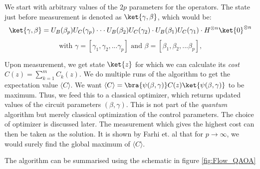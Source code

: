 We start with arbitrary values of the $2p$ parameters for the operators.
The state just before measurement is denoted as $\ket{\gamma, \beta}$, which would be:
\[
    \ket{\gamma,\beta} = U_B(\beta_p)U_C(\gamma_p)\cdot\cdot\cdot U_B(\beta_2)U_C(\gamma_2)\cdot U_B(\beta_1)U_C(\gamma_1)\cdot H^{\otimes n}\ket{0}^{\otimes n}
\]
\[\text{with }\gamma = [\gamma_1,\gamma_2,...\gamma_p] \text{ and }\beta = [\beta_1, \beta_2,...\beta_p] \text{,}\]

Upon measurement, we get state $\ket{z}$ for which we can calculate its \emph{cost} $C(z)= \sum_{k=1}^m C_k(z)$.
We do multiple runs of the algorithm to get the expectation value $ \langle C \rangle$.
We want $ \langle C \rangle = \bra{\psi(\beta, \gamma)}C(z)\ket{\psi(\beta, \gamma)}$ to be maximum.
Thus, we feed this to a classical optimizer, which returns updated values of the circuit parameters \textbf{$(\beta, \gamma)$}.
This is not part of the \textit{quantum} algorithm but merely classical optimization of the control parameters.
The choice of optimizer is discussed later.
The measurement which gives the highest cost can then be taken as the solution.
It is shown by Farhi et. al \cite{farhi2014quantum} that for $p \rightarrow \infty$, we would surely find the global maximum of $ \langle C \rangle$.

The algorithm can be summarised using the schematic in figure \ref{fig:Flow_QAOA}

